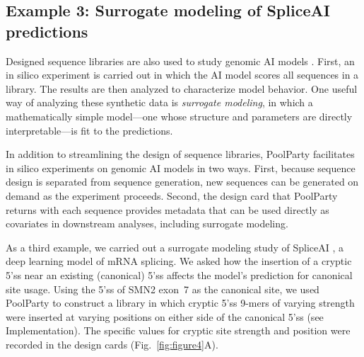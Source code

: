 \documentclass[pdflatex,sn-vancouver-num,referee,oneside]{sn-jnl}
\begin{document}
\subsection{Example 3: Surrogate modeling of SpliceAI predictions}\label{subsec:example3-spliceai}

Designed sequence libraries are also used to study genomic AI models \citep{Avsec2021bpnet, Toneyan2024creme, Seitz2024squid, Nagai2026review}. First, an in silico experiment is carried out in which the AI model scores all sequences in a library. The results are then analyzed to characterize model behavior. One useful way of analyzing these synthetic data is \emph{surrogate modeling}, in which a mathematically simple model---one whose structure and parameters are directly interpretable---is fit to the predictions.

In addition to streamlining the design of sequence libraries, PoolParty facilitates in silico experiments on genomic AI models in two ways. First, because sequence design is separated from sequence generation, new sequences can be generated on demand as the experiment proceeds. Second, the design card that PoolParty returns with each sequence provides metadata that can be used directly as covariates in downstream analyses, including surrogate modeling.

As a third example, we carried out a surrogate modeling study of SpliceAI \citep{Jaganathan2019ps}, a deep learning model of mRNA splicing. We asked how the insertion of a cryptic 5'ss near an existing (canonical) 5'ss affects the model's prediction for canonical site usage. Using the 5'ss of SMN2 exon~7 as the canonical site, we used PoolParty to construct a library in which cryptic 5'ss 9-mers of varying strength were inserted at varying positions on either side of the canonical 5'ss (see Implementation). The specific values for cryptic site strength and position were recorded in the design cards (Fig.~\ref{fig:figure4}A).
\end{document}
